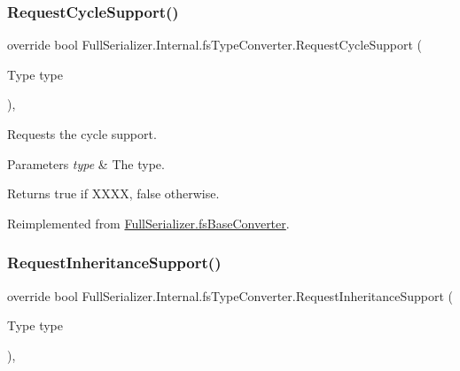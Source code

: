 \subsubsection{\texorpdfstring{Request\+Cycle\+Support()}{RequestCycleSupport()}}
{\footnotesize\ttfamily override bool Full\+Serializer.\+Internal.\+fs\+Type\+Converter.\+Request\+Cycle\+Support (\begin{DoxyParamCaption}\item[{Type}]{type }\end{DoxyParamCaption})\hspace{0.3cm}{\ttfamily [inline]}, {\ttfamily [virtual]}}



Requests the cycle support. 


\begin{DoxyParams}{Parameters}
{\em type} & The type.\\
\hline
\end{DoxyParams}
\begin{DoxyReturn}{Returns}
{\ttfamily true} if X\+X\+XX, {\ttfamily false} otherwise.
\end{DoxyReturn}


Reimplemented from \hyperlink{class_full_serializer_1_1fs_base_converter_a4e850ab88cea1b89771c00e0b65febcd}{Full\+Serializer.\+fs\+Base\+Converter}.

\mbox{\label{class_full_serializer_1_1_internal_1_1fs_type_converter_a3f4750a4e8a6a6ae582c73cf5d8142e5}} 
\subsubsection{\texorpdfstring{Request\+Inheritance\+Support()}{RequestInheritanceSupport()}}
{\footnotesize\ttfamily override bool Full\+Serializer.\+Internal.\+fs\+Type\+Converter.\+Request\+Inheritance\+Support (\begin{DoxyParamCaption}\item[{Type}]{type }\end{DoxyParamCaption})\hspace{0.3cm}{\ttfamily [inline]}, {\ttfamily [virtual]}}



